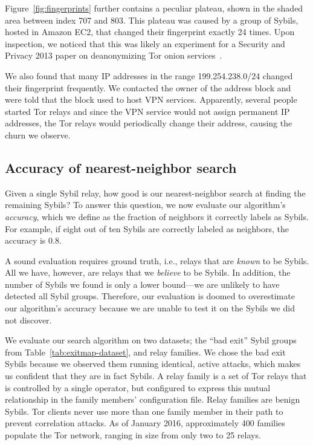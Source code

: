 Figure~\ref{fig:fingerprints} further contains a peculiar plateau, shown in the
shaded area between index 707 and 803.  This plateau was caused by a group of
Sybils, hosted in Amazon EC2, that changed their fingerprint exactly 24 times.
Upon inspection, we noticed that this was likely an experiment for a Security
and Privacy 2013 paper on deanonymizing Tor onion services~\cite{Biryukov2013a}.

We also found that many IP addresses in the range 199.254.238.0/24 changed their
fingerprint frequently.  We contacted the owner of the address block and were
told that the block used to host VPN services.  Apparently, several people
started Tor relays and since the VPN service would not assign permanent IP
addresses, the Tor relays would periodically change their address, causing the
churn we observe.

\subsection{Accuracy of nearest-neighbor search}
\label{sec:accuracy}
Given a single Sybil relay, how good is our nearest-neighbor search at finding
the remaining Sybils?  To answer this question, we now evaluate our algorithm's
\emph{accuracy}, which we define as the fraction of neighbors it correctly
labels as Sybils.  For example, if eight out of ten Sybils are correctly labeled
as neighbors, the accuracy is 0.8.

A sound evaluation requires ground truth, i.e., relays that are \emph{known} to
be Sybils.  All we have, however, are relays that we \emph{believe} to be
Sybils.  In addition, the number of Sybils we found is only a lower bound---we
are unlikely to have detected all Sybil groups.  Therefore, our evaluation is
doomed to overestimate our algorithm's accuracy because we are unable to test it
on the Sybils we did not discover.

We evaluate our search algorithm on two datasets; the ``bad exit'' Sybil groups
from Table~\ref{tab:exitmap-dataset}, and relay families.  We chose the bad exit
Sybils because we observed them running identical, active attacks, which makes
us confident that they are in fact Sybils.  A relay family is a set of Tor
relays that is controlled by a single operator, but configured to express this
mutual relationship in the family members' configuration file.  Relay families
are benign Sybils.  Tor clients never use more than one family member in their
path to prevent correlation attacks.  As of January 2016, approximately 400
families populate the Tor network, ranging in size from only two to 25 relays.

